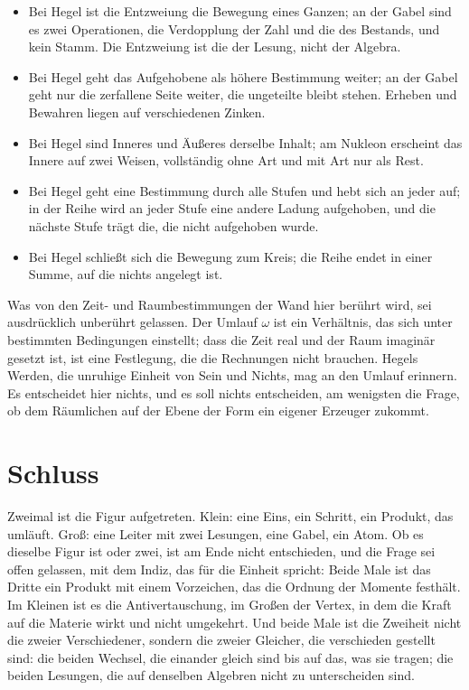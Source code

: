\documentclass[11pt,a4paper]{article}
\begin{document}
\begin{itemize}[leftmargin=1.6em,itemsep=2pt]
\item Bei Hegel ist die Entzweiung die Bewegung eines Ganzen; an der Gabel sind es zwei Operationen, die Verdopplung der Zahl und die des Bestands, und kein Stamm. Die Entzweiung ist die der Lesung, nicht der Algebra.
\item Bei Hegel geht das Aufgehobene als höhere Bestimmung weiter; an der Gabel geht nur die zerfallene Seite weiter, die ungeteilte bleibt stehen. Erheben und Bewahren liegen auf verschiedenen Zinken.
\item Bei Hegel sind Inneres und Äußeres derselbe Inhalt; am Nukleon erscheint das Innere auf zwei Weisen, vollständig ohne Art und mit Art nur als Rest.
\item Bei Hegel geht eine Bestimmung durch alle Stufen und hebt sich an jeder auf; in der Reihe wird an jeder Stufe eine andere Ladung aufgehoben, und die nächste Stufe trägt die, die nicht aufgehoben wurde.
\item Bei Hegel schließt sich die Bewegung zum Kreis; die Reihe endet in einer Summe, auf die nichts angelegt ist.
\end{itemize}

Was von den Zeit- und Raumbestimmungen der Wand hier berührt wird, sei ausdrücklich unberührt gelassen. Der Umlauf $\omega$ ist ein Verhältnis, das sich unter bestimmten Bedingungen einstellt; dass die Zeit real und der Raum imaginär gesetzt ist, ist eine Festlegung, die die Rechnungen nicht brauchen. Hegels Werden, die unruhige Einheit von Sein und Nichts, mag an den Umlauf erinnern. Es entscheidet hier nichts, und es soll nichts entscheiden, am wenigsten die Frage, ob dem Räumlichen auf der Ebene der Form ein eigener Erzeuger zukommt.

\section*{Schluss}

Zweimal ist die Figur aufgetreten. Klein: eine Eins, ein Schritt, ein Produkt, das umläuft. Groß: eine Leiter mit zwei Lesungen, eine Gabel, ein Atom. Ob es dieselbe Figur ist oder zwei, ist am Ende nicht entschieden, und die Frage sei offen gelassen, mit dem Indiz, das für die Einheit spricht: Beide Male ist das Dritte ein Produkt mit einem Vorzeichen, das die Ordnung der Momente festhält. Im Kleinen ist es die Antivertauschung, im Großen der Vertex, in dem die Kraft auf die Materie wirkt und nicht umgekehrt. Und beide Male ist die Zweiheit nicht die zweier Verschiedener, sondern die zweier Gleicher, die verschieden gestellt sind: die beiden Wechsel, die einander gleich sind bis auf das, was sie tragen; die beiden Lesungen, die auf denselben Algebren nicht zu unterscheiden sind.
\end{document}
